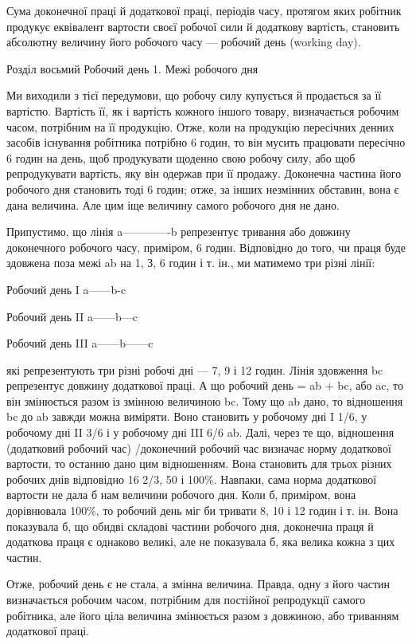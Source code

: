 Сума доконечної праці й додаткової праці, періодів часу,
протягом яких робітник продукує еквівалент вартости своєї робочої
сили й додаткову вартість, становить абсолютну величину
його робочого часу — робочий день (working day).

Розділ восьмий
Робочий день
1. Межі робочого дня

Ми виходили з тієї передумови, що робочу силу купується
й продається за її вартістю. Вартість її, як і вартість кожного
іншого товару, визначається робочим часом, потрібним на
її продукцію. Отже, коли на продукцію пересічних денних засобів
існування робітника потрібно 6 годин, то він мусить працювати
пересічно 6 годин на день, щоб продукувати щоденно свою робочу
силу, або щоб репродукувати вартість, яку він одержав при її
продажу. Доконечна частина його робочого дня становить тоді
6 годин; отже, за інших незмінних обставин, вона є дана величина.
Але цим іще величину самого робочого дня не дано.

Припустимо, що лінія a-------------b репрезентує тривання
або довжину доконечного робочого часу, приміром, 6 годин. Відповідно
до того, чи праця буде здовжена поза межі ab на 1, З,
6 годин і т. ін., ми матимемо три різні лінії:

Робочий день I
a------b-c

Робочий день II
a------b---c

Робочий день III
a------b------c

які репрезентують три різні робочі дні — 7, 9 і 12 годин. Лінія
здовження bc репрезентує довжину додаткової праці. А що робочий
день = ab + bc, або ac, то він змінюється разом із змінною
величиною bc. Тому що ab дано, то відношення bc до ab завжди
можна виміряти. Воно становить у робочому дні I 1/6, у робочому
дні II 3/6 і у робочому дні III 6/6 ab. Далі, через те що, відношення
(додатковий робочий час) /доконечний робочий час визначає норму додаткової вартости, то
останню дано цим відношенням. Вона становить для трьох різних
робочих днів відповідно 16 2/3, 50 і 100\%. Навпаки, сама норма
додаткової вартости не дала б нам величини робочого дня. Коли
б, приміром, вона дорівнювала 100\%, то робочий день міг би
тривати 8, 10 і 12 годин і т. ін. Вона показувала б, що обидві
складові частини робочого дня, доконечна праця й додаткова
праця є однаково великі, але не показувала б, яка велика кожна
з цих частин.

Отже, робочий день є не стала, а змінна величина. Правда,
одну з його частин визначається робочим часом, потрібним для
постійної репродукції самого робітника, але його ціла величина
змінюється разом з довжиною, або триванням додаткової праці.
\parbreak{}  %
